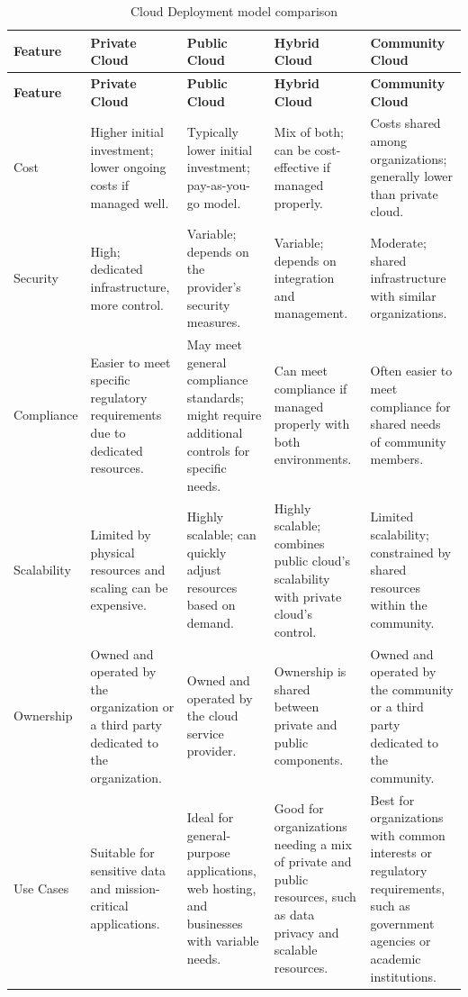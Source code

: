 \begingroup
\centering
\setlength{\tabcolsep}{6.5pt} %
\begin{longtable}{|p{2cm}| p{3cm} |p{3cm} |p{3cm}|p{3cm}|}
\caption{Cloud Deployment model comparison}
    \label{table:cloud_comp}
\hline
\rowcolor{grey!15}
\textbf{Feature} & \textbf{Private Cloud} & \textbf{Public Cloud} & \textbf{Hybrid Cloud} & \textbf{Community Cloud} \\
\hline
\endfirsthead
\hline
\rowcolor{grey!15}
\textbf{Feature} & \textbf{Private Cloud} & \textbf{Public Cloud} & \textbf{Hybrid Cloud} & \textbf{Community Cloud} \\
\hline
\endhead
\hline
\endfoot
\hline
\endlastfoot

Cost & Higher initial investment; lower ongoing costs if managed well. & Typically lower initial investment; pay-as-you-go model. & Mix of both; can be cost-effective if managed properly. & Costs shared among organizations; generally lower than private cloud. \\
\hline
Security & High; dedicated infrastructure, more control. & Variable; depends on the provider’s security measures. & Variable; depends on integration and management. & Moderate; shared infrastructure with similar organizations. \\
\hline
Compliance & Easier to meet specific regulatory requirements due to dedicated resources. & May meet general compliance standards; might require additional controls for specific needs. & Can meet compliance if managed properly with both environments. & Often easier to meet compliance for shared needs of community members. \\
\hline
Scalability & Limited by physical resources and scaling can be expensive. & Highly scalable; can quickly adjust resources based on demand. & Highly scalable; combines public cloud's scalability with private cloud’s control. & Limited scalability; constrained by shared resources within the community. \\
\hline
Ownership & Owned and operated by the organization or a third party dedicated to the organization. & Owned and operated by the cloud service provider. & Ownership is shared between private and public components. & Owned and operated by the community or a third party dedicated to the community. \\
\hline
Use Cases & Suitable for sensitive data and mission-critical applications. & Ideal for general-purpose applications, web hosting, and businesses with variable needs. & Good for organizations needing a mix of private and public resources, such as data privacy and scalable resources. & Best for organizations with common interests or regulatory requirements, such as government agencies or academic institutions. \\

\end{longtable}
